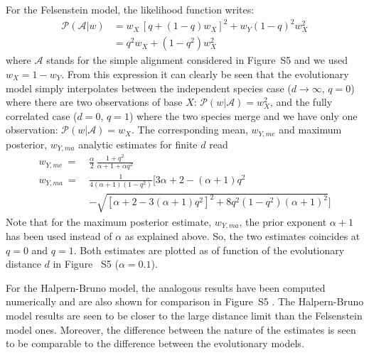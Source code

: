 \documentclass[a4,center,fleqn]{NAR}
\newcommand{\proba}{\mathcal{P}}
\begin{document}
For the Felsenstein model, the likelihood function writes:
\begin{equation}
    \begin{aligned}
        \proba(\mathcal{A}|w) 
        & = w_X\,[q+(1-q)w_X]^2 + w_Y(1-q)^2w_X^2 \\
        & = q^2w_X + (1- q^2) w_X^2
    \end{aligned}
    \label{Felsen-likely}
\end{equation}
where $\mathcal{A}$ stands for the simple alignment considered in Figure~S5
and we used $w_X=1-w_Y$.
From this expression it can clearly be seen that the evolutionary model simply
interpolates between the independent species case ($d\to\infty$, $q=0$) where
there are two observations of base $X$:
$ \proba(w|\mathcal{A}) = w_X^2$, and the fully correlated case ($d=0$, $q=1$)
where the two species merge and we have only one observation:
$ \proba(w|\mathcal{A}) = w_X$.
The corresponding mean, $w_{Y,me}$ and maximum posterior, $w_{Y,ma}$ analytic
estimates for finite $d$ read
\begin{equation*}
    \begin{split}
        w_{Y,me}\ =\ &\frac{\alpha}{2} \, \frac{1+ q^2}{\alpha+1+\alpha q^2}\\
        w_{Y,ma}\ =\ &\frac{1}{4(\alpha+1)(1-q^2)} \bigg[ 3 \alpha +2 - (\alpha+1) q^2\\
              &- \sqrt{[\alpha+2-3(\alpha+1)q^2]^2+ 8 q^2(1-q^2)(\alpha+1)^2}\bigg]
    \end{split}
\end{equation*}
Note that for the maximum posterior estimate, $w_{Y,ma}$, the prior exponent
$\alpha +1$ has been used instead of $\alpha$ as explained above.
So, the two estimates  coincides  at $q=0$ and $q=1$.
Both estimates are plotted as of function of the evolutionary distance $d$ in
Figure~ S5
($\alpha=0.1$).

For the Halpern-Bruno model, the analogous results have been computed
numerically and are also shown for comparison in Figure~S5
.
The Halpern-Bruno model results are seen to be closer to the large distance
limit than the Felsenstein model ones.
Moreover, the difference between the nature of the estimates is seen to be
comparable to the difference between the evolutionary models.
\end{document}
